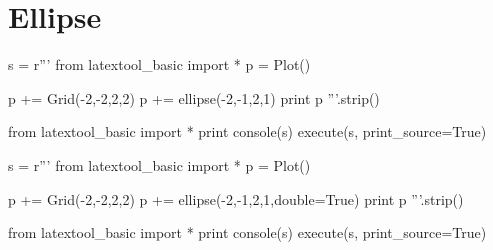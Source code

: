 \section{Ellipse}

\begin{python}
s = r'''
from latextool_basic import *
p = Plot()

p += Grid(-2,-2,2,2)
p += ellipse(-2,-1,2,1)
print p
'''.strip()

from latextool_basic import *
print console(s)
execute(s, print_source=True)
\end{python}

\begin{python}
s = r'''
from latextool_basic import *
p = Plot()

p += Grid(-2,-2,2,2)
p += ellipse(-2,-1,2,1,double=True)
print p
'''.strip()


from latextool_basic import *
print console(s)
execute(s, print_source=True)
\end{python}


